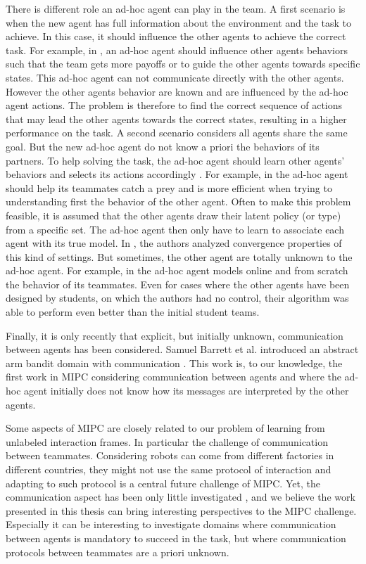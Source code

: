 There is different role an ad-hoc agent can play in the team. A first scenario is when the new agent has full information about the environment and the task to achieve. In this case, it should influence the other agents to achieve the correct task. For example, in  \cite{stone2010teach,stone2013teaching}, an ad-hoc agent should influence other agents behaviors such that the team gets more payoffs or to guide the other agents towards specific states. This ad-hoc agent can not communicate directly with the other agents. However the other agents behavior are known and are influenced by the ad-hoc agent actions. The problem is therefore to find the correct sequence of actions that may lead the other agents towards the correct states, resulting in a higher performance on the task. A second scenario considers all agents share the same goal. But the new ad-hoc agent do not know a priori the behaviors of its partners. To help solving the task, the ad-hoc agent should learn other agents' behaviors and selects its actions accordingly  \cite{barrett2011adhoc,barrett2011empirical,barrett2013team}. For example, in \cite{barrett2011empirical} the ad-hoc agent should help its teammates catch a prey and is more efficient when trying to understanding first the behavior of the other agent. Often to make this problem feasible, it is assumed that the other agents draw their latent policy (or type) from a specific set. The ad-hoc agent then only have to learn to associate each agent with its true model. In \cite{albrecht2014uai}, the authors analyzed convergence properties of this kind of settings. But sometimes, the other agent are totally unknown to the ad-hoc agent. For example, in \cite{barrett2011empirical} the ad-hoc agent models online and from scratch the behavior of its teammates. Even for cases where the other agents have been designed by students, on which the authors had no control, their algorithm was able to perform even better than the initial student teams.

Finally, it is only recently that explicit, but initially unknown, communication between agents has been considered. Samuel Barrett et al. introduced an abstract arm bandit domain with communication \cite{barrett2013communicating}. This work is, to our knowledge, the first work in MIPC considering communication between agents and where the ad-hoc agent initially does not know how its messages are interpreted by the other agents.

\transition

Some aspects of MIPC are closely related to our problem of learning from unlabeled interaction frames. In particular the challenge of communication between teammates. Considering robots can come from different factories in different countries, they might not use the same protocol of interaction and adapting to such protocol is a central future challenge of MIPC. Yet, the communication aspect has been only little investigated \cite{barrett2013communicating}, and we believe the work presented in this thesis can bring interesting perspectives to the MIPC challenge. Especially it can be interesting to investigate domains where communication between agents is mandatory to succeed in the task, but where communication protocols between teammates are a priori unknown.

